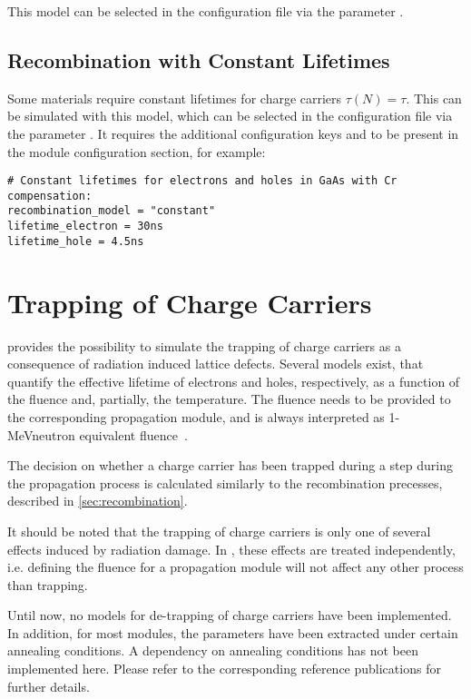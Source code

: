 This model can be selected in the configuration file via the parameter .

\subsection{Recombination with Constant Lifetimes}

Some materials require constant lifetimes for charge carriers $\tau (N) = \tau$.
This can be simulated with this model, which can be selected in the configuration file via the parameter .
It requires the additional configuration keys  and  to be present in the module configuration section, for example:

\begin{verbatim}
# Constant lifetimes for electrons and holes in GaAs with Cr compensation:
recombination_model = "constant"
lifetime_electron = 30ns
lifetime_hole = 4.5ns
\end{verbatim}


\section{Trapping of Charge Carriers}
\label{sec:trapping}

\apsq provides the possibility to simulate the trapping of charge carriers as a consequence of radiation induced lattice defects.
Several models exist, that quantify the effective lifetime of electrons and holes, respectively, as a function of the fluence and, partially, the temperature.
The fluence needs to be provided to the corresponding propagation module, and is always interpreted as 1-MeVneutron equivalent fluence~\cite{niel}.

The decision on whether a charge carrier has been trapped during a step during the propagation process is calculated similarly to the recombination precesses, described in \ref{sec:recombination}.

It should be noted that the trapping of charge carriers is only one of several effects induced by radiation damage.
In \apsq, these effects are treated independently, i.e. defining the fluence for a propagation module will not affect any other process than trapping.

Until now, no models for de-trapping of charge carriers have been implemented.
In addition, for most modules, the parameters have been extracted under certain annealing conditions.
A dependency on annealing conditions has not been implemented here.
Please refer to the corresponding reference publications for further details.


